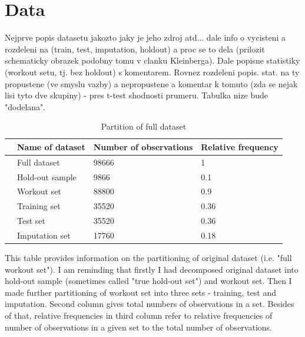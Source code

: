 \documentclass[12pt, twoside]{book} %
\begin{document}
\section{Data}     %

Nejprve popis datasetu jakozto jaky je jeho zdroj atd... dale info o vycisteni a  rozdeleni na (train, test, imputation, holdout) a proc se to dela (prilozit schematicky obrazek podobny tomu v clanku Kleinberga). Dale popisne statistiky (workout setu, tj. bez holdout) s komentarem. Rovnez rozdeleni popis. stat. na ty propustene (ve smyslu vazby) a nepropustene a komentar k tomuto (zda se nejak lisi tyto dve skupiny) -  pres t-test shodnosti prumeru. Tabulka nize bude "dodelana". 

\begin{table}[ht]
\centering
\begin{tabular}{rlll}
  \hline
 & Name of dataset & Number of observations & Relative frequency \\ 
  \hline
 & Full dataset & 98666 & 1 \\ 
  & Hold-out sample & 9866 & 0.1 \\ 
   & Workout set & 88800 & 0.9 \\ 
   & 	\hspace{1cm}Training set & 35520 & 0.36 \\ 
  & 	\hspace{1cm}Test set & 35520 & 0.36 \\ 
   &	\hspace{1cm}Imputation set & 17760 & 0.18 \\ 
   \hline
\end{tabular}

\caption{Partition of full dataset}
\medskip
{\small This table provides information on the partitioning of original dataset (i.e. "full workout set"). I am reminding that firstly I had decomposed original dataset into hold-out sample (sometimes called "true hold-out set") and workout set. Then I made further partitioning of workout set into three sets - training, test and imputation. Second column gives total numbers of observations in a set. Besides of that, relative frequencies in third column refer to relative frequencies of number of observations in a given set to the total number of observations. }

\end{table}
\end{document}

